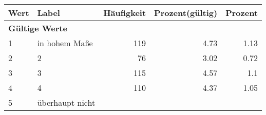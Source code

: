      \begin{longtable}{lXrrr}
     \toprule
     \textbf{Wert} & \textbf{Label} & \textbf{Häufigkeit} & \textbf{Prozent(gültig)} & \textbf{Prozent} \\
     \endhead
     \midrule
     \multicolumn{5}{l}{\textbf{Gültige Werte}}\\

     1 &
     \multicolumn{1}{X}{ in hohem Maße   } &


       \num{119} &
       \num[round-mode=places,round-precision=2]{4,73} &
         \num[round-mode=places,round-precision=2]{1,13} \\

     2 &
     \multicolumn{1}{X}{ 2   } &


       \num{76} &
       \num[round-mode=places,round-precision=2]{3,02} &
         \num[round-mode=places,round-precision=2]{0,72} \\

     3 &
     \multicolumn{1}{X}{ 3   } &


       \num{115} &
       \num[round-mode=places,round-precision=2]{4,57} &
         \num[round-mode=places,round-precision=2]{1,1} \\

     4 &
     \multicolumn{1}{X}{ 4   } &


       \num{110} &
       \num[round-mode=places,round-precision=2]{4,37} &
         \num[round-mode=places,round-precision=2]{1,05} \\

     5 &
     \multicolumn{1}{X}{ überhaupt nicht   } &



\end{longtable}
